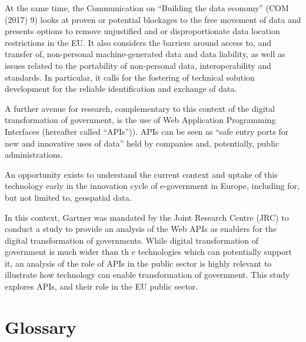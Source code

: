 At the same time, the Communication on “Building the data economy” (COM (2017) 9)
looks at proven or potential blockages to the free movement of data and presents
options to remove unjustified and or disproportionate data location restrictions
in the EU. It also considers the barriers around access to, and transfer of,
non-personal machine-generated data and data liability, as well as issues related
to the portability of non-personal data, interoperability and standards.
In particular, it calls for the fostering of technical solution development for
the reliable identification and exchange of data. 

A further avenue for research, complementary to this context of the digital
transformation of government, is the use of Web Application Programming Interfaces
(hereafter called “APIs”)). APIs can be seen as “safe entry ports for new and
innovative uses of data” held by companies and, potentially, public administrations.

An opportunity exists to understand the current context and uptake of this technology
early in the innovation cycle of e-government in Europe, including for, but not
limited to, geospatial data. 

In this context, Gartner was mandated by the Joint Research Centre (JRC) to
conduct a study to provide an analysis of the Web APIs as enablers for the
digital transformation of governments. While digital transformation of
government is much wider than th e technologies which can potentially support
it, an analysis of the role of APIs in the public sector is highly relevant to
illustrate how technology can enable transformation of government. This study
explores APIs, and their role in the EU public sector.

\clearpage

\section{Glossary} %

